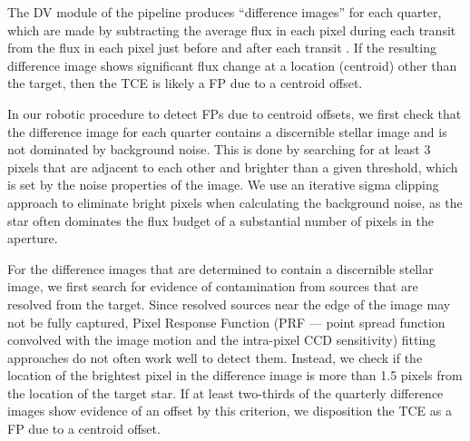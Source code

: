 

The DV module of the \kepler{} pipeline produces ``difference images'' for each quarter, which are made by subtracting the average flux in each pixel during each transit from the flux in each pixel just before and after each transit \citep{Bryson2013}. If the resulting difference image shows significant flux change at a location (centroid) other than the target, then the TCE is likely a FP due to a centroid offset.



In our robotic procedure to detect FPs due to centroid offsets, we first check that the difference image for each quarter contains a discernible stellar image and is not dominated by background noise. This is done by searching for at least 3 pixels that are adjacent to each other and brighter than a given threshold, which is set by the noise properties of the image. We use an iterative sigma clipping approach to eliminate bright pixels when calculating the background noise, as the star often dominates the flux budget of a substantial number of pixels in the aperture.

For the difference images that are determined to contain a discernible stellar image, we first search for evidence of contamination from sources that are resolved from the target. Since resolved sources near the edge of the image may not be fully captured, Pixel Response Function (PRF --- \keplers{} point spread function convolved with the image motion and the intra-pixel CCD sensitivity) fitting approaches do not often work well to detect them. Instead, we check if the location of the brightest pixel in the difference image is more than 1.5 pixels from the location of the target star. If at least two-thirds of the quarterly difference images show evidence of an offset by this criterion, we disposition the TCE as a FP due to a centroid offset. %

